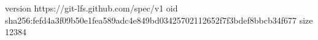 version https://git-lfs.github.com/spec/v1
oid sha256:fefd4a3f09b50e1fea589adc4e849bd03425702112652f7f3bdef8bbcb34f677
size 12384
